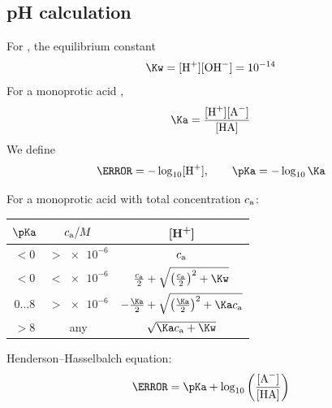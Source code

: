 \documentclass[11pt,a4paper,twoside]{article}
\numberwithin{equation}{section}
\newcommand{\ca}{\ensuremath{c_{\rm a}}}
\begin{document}
\subsection{pH calculation}

For , the equilibrium constant
\begin{equation}
    \Kw = [\ce{H+}][\ce{OH-}] = \num{e-14}
\end{equation}
For a monoprotic acid ,
\begin{equation}
    \Ka = \frac{[\ce{H+}][\ce{A-}]}{[\ce{HA}]}
\end{equation}
We define
\begin{equation}
    \pH = -\log_{10} [\ce{H+}], \qquad
    \pKa = -\log_{10} \Ka
\end{equation}

For a monoprotic acid with total concentration $\ca$:
\renewcommand{\arraystretch}{1.5}
\begin{center}
    \begin{tabularx}{0.675\textwidth}{|c|c|C|}
        \hline
        $\pKa$ & $ \ca / M $ & [H\textsuperscript{+}] \\
        \hline
        $ {} < 0$ & $ {} > \num{e-6}$ & $\ca$ \\
        $ {} < 0$ & $ {} < \num{e-6}$ & $\frac{\ca}{2} + \sqrt{\qty(\frac{\ca}{2})^2 + \Kw}$ \\
        $0 \ldots 8$ & $ {} > \num{e-6} $ & 
        $ -\frac{\Ka}{2} + \sqrt{\qty(
            \frac{\Ka}{2}
        )^2 + \Ka \ca} $ \\
        ${} > 8$ & any & $\sqrt{\Ka \ca + \Kw}$ \\
        \hline
    \end{tabularx}
    \end{center}

Henderson--Hasselbalch equation:
\begin{equation}
    \pH = \pKa + \log_{10} \qty( \frac{[\ce{A-}]}{[\ce{HA}]} )
\end{equation}
\end{document}
